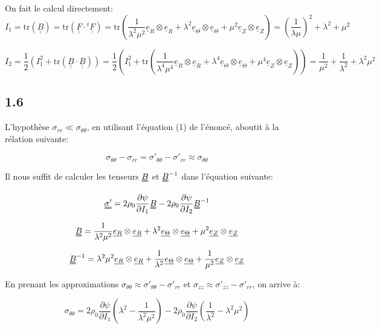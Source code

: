 \documentclass[a4paper,11pt]{article}
\newcommand{\tens}{\uuline}
\newcommand{\diage}[1]{\uline{e_{#1}} \otimes \uline{e_{#1}}}
\begin{document}
\subsection{}
On fait le calcul directement: $$I_1=\text{tr}\left(\underline{\underline{B}}\right) = \text{tr}\left(\underline{\underline{F}}\cdot{}^{t}\underline{\underline{F}}\right) = \text{tr}\left(\frac{1}{\lambda^2\mu^2}\underline{e}_R\otimes\underline{e}_R + \lambda^2\underline{e}_\Theta\otimes\underline{e}_\Theta + \mu^2\underline{e}_Z\otimes\underline{e}_Z \right)=\left(\frac{1}{\lambda\mu}\right)^2+\lambda^2+\mu^2$$

	$$I_2 = \frac{1}{2}\left(I_1^2+\text{tr}\left(\underline{\underline{B}}\cdot\underline{\underline{B}}\right)\right) = \frac{1}{2}\left(I_1^2+\text{tr}\left( \frac{1}{\lambda^4\mu^4}\underline{e}_R\otimes\underline{e}_R + \lambda^4\underline{e}_\Theta\otimes\underline{e}_\Theta + \mu^4\underline{e}_Z\otimes\underline{e}_Z \right)\right)  = \frac{1}{\mu^2}+\frac{1}{\lambda^2}+\lambda^2\mu^2$$



\subsection*{1.6}

L'hypothèse $\sigma_{rr} \ll \sigma_{\theta\theta}$, en utilisant l'équation (1) de l'énoncé, aboutit à la rélation suivante:

$$\sigma_{\theta\theta} - \sigma_{rr} = \sigma'_{\theta\theta} - \sigma'_{rr} \approx \sigma_{\theta\theta}$$

Il nous suffit de calculer les tenseurs $\tens{B}$ et $\tens{B}^{-1}$ dans l'équation suivante:

$$ \tens{\sigma'} = 2 \rho_0 \frac{\partial\psi}{\partial I_1} \tens {B} - 2 \rho_0 \frac{\partial\psi}{\partial I_2} \tens {B}^{-1}$$

$$ \tens{B} = \frac{1}{\lambda^2\mu^2} \diage{R} + \lambda^2 \diage{\Theta} + \mu^2 \diage{Z} $$

$$ \tens{B}^{-1} = \lambda^2\mu^2 \diage{R} + \frac{1}{\lambda^2} \diage{\Theta} + \frac{1}{\mu^2} \diage{Z} $$

En prenant les approximations $\sigma_{\theta\theta} \approx \sigma'_{\theta\theta} - \sigma'_{rr}$ et $\sigma_{zz} \approx \sigma'_{zz} - \sigma'_{rr}$, on arrive à:

$$\sigma_{\theta\theta} = 2 \rho_0 \frac{\partial\psi}{\partial I_1} \left( \lambda^2 - \frac{1}{\lambda^2\mu^2} \right) - 2 \rho_0 \frac{\partial\psi}{\partial I_2} \left( \frac{1}{\lambda^2} - \lambda^2\mu^2 \right)$$
\end{document}
